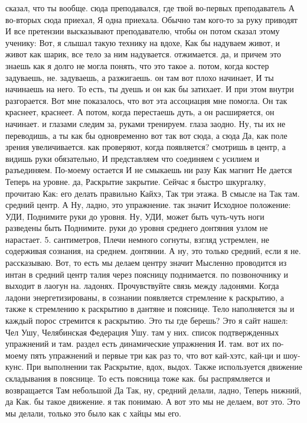 сказал, что ты вообще.
сюда преподавался, где твой во-первых преподаватель А во-вторых
сюда приехал, Я одна приехала.
Обычно там кого-то за руку приводят И все претензии высказывают преподавателю, чтобы он потом сказал этому ученику: Вот, я слышал такую технику на вдохе, Как бы надуваем живот, и живот как шарик, все тело за ним надувается.
отжимается. да, и причем это знаешь как я долго не могла понять, что это такое а.
потом, когда костер задуваешь, не.
задуваешь, а разжигаешь. он там вот плохо начинает, И ты начинаешь на него.
То есть, ты дуешь и он как бы затихает.
И при этом внутри разгорается. Вот мне показалось, что вот эта ассоциация мне помогла.
Он так краснеет, краснеет.
А потом, когда перестаешь дуть, а он расширяется, он начинает.
и глазами следим за, руками тренируем.
глаза заодно. Ну, ты их не переводишь, а ты как бы одновременно вот так вот сюда, а сюда Да, как поле зрения увеличивается.
как проверяют, когда появляется?
смотришь в центр, а видишь руки обязательно, И представляем что соединяем с усилием и разъединяем.
По-моему остается И не смыкаешь ни разу Как магнит Не дается Теперь на уровне.
да, Раскрытие закрытие. Сейчас я быстро шкургалку, прочитаю Как:
его делать правильно Кайхэ, Так три этажа.
В смысле на Так там.
средний центр. А Ну, ладно, это упражнение. так значит Исходное положение: УДИ, Поднимите руки до уровня. Ну, УДИ, может быть чуть-чуть ноги разведены быть Поднимите.
руки до уровня среднего донтяния узлом не нарастает. 5.
сантиметров, Плечи немного согнуты, взгляд устремлен, не содерживая сознания, на среднем.
донтянии. А ну, это только средний, если я не.
рассказываю. Вот, то есть мы делаем центру значит Мысленно проводится из интан в средний центр талия через поясницу поднимается.
по позвоночнику и выходит в лаогун на.
ладонях. Прочувствуйте связь между ладонями. Когда ладони энергетизированы, в сознании появляется стремление к раскрытию, а также к стремлению к раскрытию в дантяне и пояснице.
Тело наполняется зы и каждый порос стремится к раскрытию. Это ты где берешь?
Это я сайт нашел: Чел Ушу, Челябинская Федерация Ушу.
там у них.
список подтвержденных упражнений и там.
раздел есть динамические упражнения И.
там. вот их по-моему пять упражнений и первые три как раз то, что вот кай-хэтс, кай-ци и шоу-кунс. При выполнении так Раскрытие, вдох, выдох. Также используется движение складывания в пояснице.
То есть поясница тоже как.
бы распрямляется и возвращается Там небольшой Да Так, ну, средний делали, ладно, Теперь нижний, да Как.
бы такое движение. я так понимаю. А вот это мы не делаем, вот это.
Это мы делали, только это было как с хайцы мы его.
